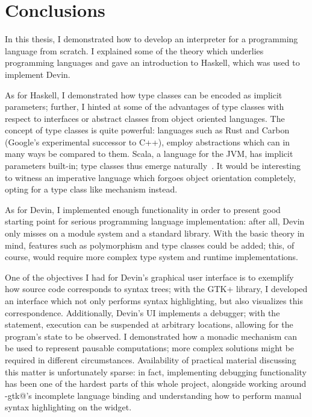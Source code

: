 \documentclass[UdineBachThesis,american,11pt]{PhdThesis}
\begin{document}
  \chapter{Conclusions}

  In this thesis, I demonstrated how to develop an interpreter for a programming
  language from scratch. I explained some of the theory which underlies
  programming languages and gave an introduction to Haskell, which was used
  to implement Devin.

  As for Haskell, I demonstrated how type classes can be encoded as implicit
  parameters; further, I hinted at some of the advantages of type classes with
  respect to interfaces or abstract classes from object oriented languages. The
  concept of type classes is quite powerful: languages such as Rust and Carbon
  (Google's experimental successor to C++), employ abstractions which can in
  many ways be compared to them. Scala, a language for the JVM, has implicit
  parameters built-in; type classes thus emerge
  naturally~\cite{scala-type-classes}. It would be interesting to witness an
  imperative language which forgoes object orientation completely, opting for a
  type class like mechanism instead.

  As for Devin, I implemented enough functionality in order to present good
  starting point for serious programming language implementation: after all,
  Devin only misses on a module system and a standard library. With the basic
  theory in mind, features such as polymorphism and type classes could be added;
  this, of course, would require more complex type system and runtime
  implementations.

  One of the objectives I had for Devin's graphical user interface is to
  exemplify how source code corresponds to syntax trees; with the GTK+ library,
  I developed an interface which not only performs syntax highlighting, but also
  visualizes this correspondence. Additionally, Devin's UI implements a
  debugger; with the \lstinline@debug@ statement, execution can be suspended at
  arbitrary locations, allowing for the program's state to be observed. I
  demonstrated how a monadic mechanism can be used to represent pausable
  computations; more complex solutions might be required in different
  circumstances. Availability of practical material discussing this matter is
  unfortunately sparse: in fact, implementing debugging functionality has been
  one of the hardest parts of this whole project, alongside working around
  \lstinline@gi-gtk@'s incomplete language binding and understanding how to
  perform manual syntax highlighting on the \lstinline@GtkSourceView@ widget.
\end{document}
